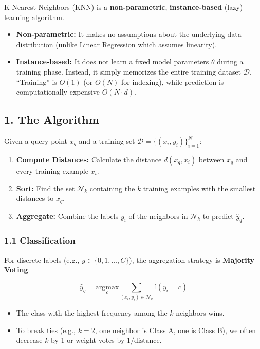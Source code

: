 \documentclass[
  italian,
  11pt,
]{article}
\begin{document}
K-Nearest Neighbors (KNN) is a \textbf{non-parametric},
\textbf{instance-based} (lazy) learning algorithm.

\begin{itemize}
\item
  \textbf{Non-parametric:} It makes no assumptions about the underlying
  data distribution (unlike Linear Regression which assumes linearity).
\item
  \textbf{Instance-based:} It does not learn a fixed model parameters
  \(\theta\) during a training phase. Instead, it simply memorizes the
  entire training dataset \(\mathcal{D}\). ``Training'' is \(O(1)\) (or
  \(O(N)\) for indexing), while prediction is computationally expensive
  \(O(N \cdot d)\).
\end{itemize}

\subsection{1. The Algorithm}\label{the-algorithm-4}

Given a query point \(x_q\) and a training set
\(\mathcal{D} = \{(x_i, y_i)\}_{i=1}^N\):

\begin{enumerate}
\def\labelenumi{\arabic{enumi}.}
\item
  \textbf{Compute Distances:} Calculate the distance \(d(x_q, x_i)\)
  between \(x_q\) and every training example \(x_i\).
\item
  \textbf{Sort:} Find the set \(\mathcal{N}_k\) containing the \(k\)
  training examples with the smallest distances to \(x_q\).
\item
  \textbf{Aggregate:} Combine the labels \(y_i\) of the neighbors in
  \(\mathcal{N}_k\) to predict \(\hat{y}_q\).
\end{enumerate}

\subsubsection{1.1 Classification}\label{classification}

For discrete labels (e.g., \(y \in \{0, 1, \dots, C\}\)), the
aggregation strategy is \textbf{Majority Voting}.

\[\hat{y}_q = \underset{c}{\text{argmax}} \sum_{(x_i, y_i) \in \mathcal{N}_k} \mathbb{I}(y_i = c)\]

\begin{itemize}
\item
  The class with the highest frequency among the \(k\) neighbors wins.
\item
  To break ties (e.g., \(k=2\), one neighbor is Class A, one is Class
  B), we often decrease \(k\) by 1 or weight votes by
  \(1/\text{distance}\).
\end{itemize}
\end{document}
